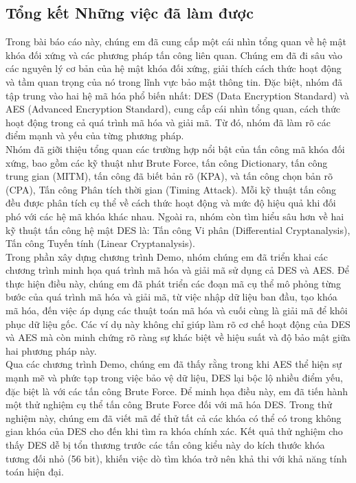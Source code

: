 \subsection{Tổng kết Những việc đã làm được}
Trong bài báo cáo này, chúng em đã cung cấp một cái nhìn tổng quan về hệ mật khóa đối xứng và các phương pháp tấn công liên quan. Chúng em đã đi sâu vào các nguyên lý cơ bản của hệ mật khóa đối xứng, giải thích cách thức hoạt động và tầm quan trọng của nó trong lĩnh vực bảo mật thông tin. Đặc biệt, nhóm đã tập trung vào hai hệ mã hóa phổ biến nhất: DES (Data Encryption Standard) và AES (Advanced Encryption Standard), cung cấp cái nhìn tổng quan, cách thức hoạt động trong cả quá trình mã hóa và giải mã. Từ đó, nhóm đã làm rõ các điểm mạnh và yếu của từng phương pháp.\\

Nhóm đã giỡi thiệu tổng quan các trường hợp nổi bật của tấn công mã khóa đối xứng, bao gồm các kỹ thuật như Brute Force, tấn công Dictionary, tấn công trung gian (MITM), tấn công đã biết bản rõ (KPA), và tấn công chọn bản rõ (CPA), Tấn công Phân tích thời gian (Timing Attack). Mỗi kỹ thuật tấn công đều được phân tích cụ thể về cách thức hoạt động và mức độ hiệu quả khi đối phó với các hệ mã khóa khác nhau. Ngoài ra, nhóm còn tìm hiểu sâu hơn về hai kỹ thuật tấn công hệ mật DES là: Tấn công Vi phân (Differential Cryptanalysis), Tấn công Tuyến tính (Linear Cryptanalysis).\\

Trong phần xây dựng chương trình Demo, nhóm chúng em đã triển khai các chương trình minh họa quá trình mã hóa và giải mã sử dụng cả DES và AES. Để thực hiện điều này, chúng em đã phát triển các đoạn mã cụ thể mô phỏng từng bước của quá trình mã hóa và giải mã, từ việc nhập dữ liệu ban đầu, tạo khóa mã hóa, đến việc áp dụng các thuật toán mã hóa và cuối cùng là giải mã để khôi phục dữ liệu gốc. Các ví dụ này không chỉ giúp làm rõ cơ chế hoạt động của DES và AES mà còn minh chứng rõ ràng sự khác biệt về hiệu suất và độ bảo mật giữa hai phương pháp này.\\

Qua các chương trình Demo, chúng em đã thấy rằng trong khi AES thể hiện sự mạnh mẽ và phức tạp trong việc bảo vệ dữ liệu, DES lại bộc lộ nhiều điểm yếu, đặc biệt là với các tấn công Brute Force. Để minh họa điều này, em đã tiến hành một thử nghiệm cụ thể tấn công Brute Force đối với mã hóa DES. Trong thử nghiệm này, chúng em đã viết mã để thử tất cả các khóa có thể có trong không gian khóa của DES cho đến khi tìm ra khóa chính xác. Kết quả thử nghiệm cho thấy DES dễ bị tổn thương trước các tấn công kiểu này do kích thước khóa tương đối nhỏ (56 bit), khiến việc dò tìm khóa trở nên khả thi với khả năng tính toán hiện đại.\\

